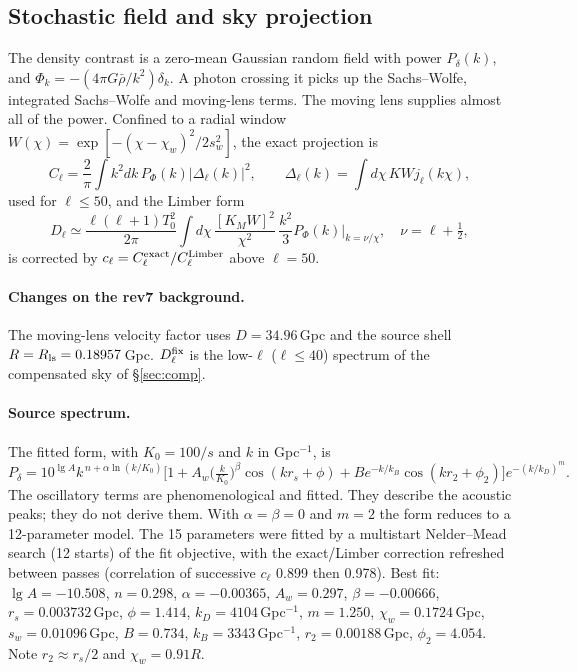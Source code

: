 \documentclass[11pt]{article}
\begin{document}
\subsection{Stochastic field and sky projection}\label{sec:field}
The density contrast is a zero-mean Gaussian random field with power $P_\delta(k)$, and $\Phi_k=-(4\pi G\bar\rho/k^2)\delta_k$. A photon crossing it picks up the Sachs--Wolfe, integrated Sachs--Wolfe and moving-lens terms. The moving lens supplies almost all of the power. Confined to a radial window $W(\chi)=\exp[-(\chi-\chi_w)^2/2s_w^2]$, the exact projection is
\begin{equation}
C_\ell=\frac{2}{\pi}\int k^2dk\,P_\Phi(k)|\Delta_\ell(k)|^2,\qquad \Delta_\ell(k)=\int d\chi\,KWj_\ell(k\chi),\label{eq:exact}
\end{equation}
used for $\ell\le50$, and the Limber form
\begin{equation}
D_\ell\simeq\frac{\ell(\ell+1)T_0^2}{2\pi}\int d\chi\,\frac{[K_MW]^2}{\chi^2}\,\frac{k^2}{3}P_\Phi(k)\Big|_{k=\nu/\chi},\quad \nu=\ell+\tfrac12,\label{eq:limber}
\end{equation}
is corrected by $c_\ell=C^{\rm exact}_\ell/C^{\rm Limber}_\ell$ above $\ell=50$.

\paragraph{Changes on the rev7 background.} The moving-lens velocity factor uses $D=34.96$\,Gpc and the source shell $R=R_{\rm ls}=0.18957$\,Gpc. $D^{\rm fix}_\ell$ is the low-$\ell$ ($\ell\le40$) spectrum of the compensated sky of \S\ref{sec:comp}.

\paragraph{Source spectrum.} The fitted form, with $K_0=100/s$ and $k$ in Gpc$^{-1}$, is
\begin{equation}
P_\delta=10^{\lg A}k^{\,n+\alpha\ln(k/K_0)}\Big[1+A_w\Big(\tfrac{k}{K_0}\Big)^{\beta}\cos(kr_s+\phi)+Be^{-k/k_B}\cos(kr_2+\phi_2)\Big]e^{-(k/k_D)^m}.\label{eq:Pk}
\end{equation}
The oscillatory terms are phenomenological and fitted. They describe the acoustic peaks; they do not derive them. With $\alpha=\beta=0$ and $m=2$ the form reduces to a 12-parameter model. The 15 parameters were fitted by a multistart Nelder--Mead search (12 starts) of the fit objective, with the exact/Limber correction refreshed between passes (correlation of successive $c_\ell$ 0.899 then 0.978). Best fit: $\lg A=-10.508$, $n=0.298$, $\alpha=-0.00365$, $A_w=0.297$, $\beta=-0.00666$, $r_s=0.003732$\,Gpc, $\phi=1.414$, $k_D=4104$\,Gpc$^{-1}$, $m=1.250$, $\chi_w=0.1724$\,Gpc, $s_w=0.01096$\,Gpc, $B=0.734$, $k_B=3343$\,Gpc$^{-1}$, $r_2=0.00188$\,Gpc, $\phi_2=4.054$. Note $r_2\approx r_s/2$ and $\chi_w=0.91R$.
\end{document}
